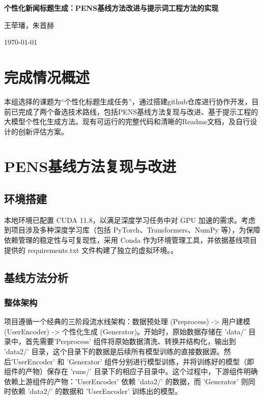 \documentclass[10pt,a4paper]{article}
\begin{document}
\begin{center}
    \LARGE{\textbf{个性化新闻标题生成：PENS基线方法改进与提示词工程方法的实现}}
    
    \vspace{0.5cm}
    \large{王荦璠，朱首赫}
    
    \vspace{0.3cm}
    \today
\end{center}

\section{完成情况概述}
本组选择的课题为“个性化标题生成任务”，通过搭建github仓库进行协作开发，目前已完成了两个备选技术路线，包括PENS基线方法复现与改进、基于提示工程的大模型个性化生成方法。现有可运行的完整代码和清晰的Readme文档，及自行设计的创新评估方案。

\section{PENS基线方法复现与改进}
\subsection{环境搭建}
本地环境已配置 CUDA 11.8，以满足深度学习任务中对 GPU 加速的需求。考虑到项目涉及多种深度学习库（包括 PyTorch、Transformers、NumPy 等），为保障依赖管理的稳定性与可复现性，采用 Conda 作为环境管理工具，并依据基线项目提供的 requirements.txt 文件构建了独立的虚拟环境。。

\subsection{基线方法分析}
\subsubsection{整体架构}
项目遵循一个经典的三阶段流水线架构：数据预处理 (Preprocess) -> 用户建模 (UserEncoder) -> 个性化生成 (Generator)。开始时，原始数据存储在 'data/' 目录中，首先需要'Preprocess' 组件将原始数据清洗、转换并结构化，输出到 'data2/' 目录，这个目录下的数据是后续所有模型训练的直接数据源。然后'UserEncoder' 和 'Generator' 组件分别进行模型训练，并将训练好的模型（即组件的产物）保存在 'runs/' 目录下的相应子目录中。这个过程中，下游组件明确依赖上游组件的产物：'UserEncoder' 依赖 'data2/' 的数据，而 'Generator' 则同时依赖 'data2/' 的数据和 'UserEncoder' 训练出的模型。
\end{document}
